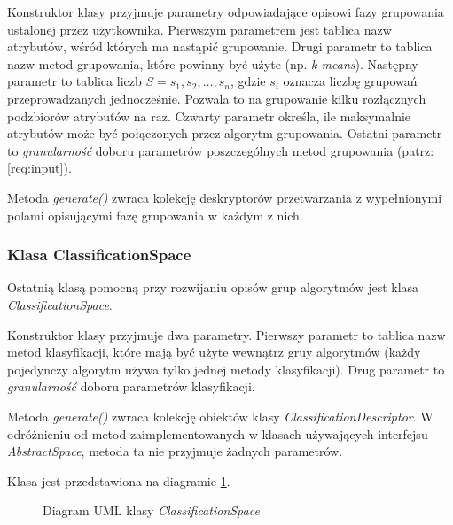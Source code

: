 \documentclass[../thesis.tex]{subfiles}
\begin{document}
Konstruktor klasy przyjmuje parametry odpowiadające opisowi fazy grupowania ustalonej przez użytkownika. Pierwszym parametrem jest tablica nazw atrybutów, wśród których ma nastąpić grupowanie. Drugi parametr to tablica nazw metod grupowania, które powinny być użyte (np. \emph{k-means}). Następny parametr to tablica liczb $S = s_1, s_2, \ldots, s_n$, gdzie $s_i$ oznacza liczbę grupowań przeprowadzanych jednocześnie. Pozwala to na grupowanie kilku rozłącznych podzbiorów atrybutów na raz. Czwarty parametr określa, ile maksymalnie atrybutów może być połączonych przez algorytm grupowania. Ostatni parametr to \emph{granularność} doboru parametrów poszczególnych metod grupowania (patrz: \ref{req:input}).

Metoda \emph{generate()} zwraca kolekcję deskryptorów przetwarzania z wypełnionymi polami opisującymi fazę grupowania w każdym z nich.

\subsubsection{Klasa ClassificationSpace}

Ostatnią klasą pomocną przy rozwijaniu opisów grup algorytmów jest klasa \emph{ClassificationSpace}.

Konstruktor klasy przyjmuje dwa parametry. Pierwszy parametr to tablica nazw metod klasyfikacji, które mają być użyte wewnątrz gruy algorytmów (każdy pojedynczy algorytm używa tylko jednej metody klasyfikacji). Drug parametr to \emph{granularność} doboru parametrów klasyfikacji.

Metoda \emph{generate()} zwraca kolekcję obiektów klasy \emph{ClassificationDescriptor}. W odróżnieniu od metod zaimplementowanych w klasach używających interfejsu \emph{AbstractSpace}, metoda ta nie przyjmuje żadnych parametrów.

Klasa jest przedstawiona na diagramie \ref{proj:diagram_classification_space}.

\begin{figure}[h]
\centering
{}
\caption{Diagram UML klasy \emph{ClassificationSpace}}
\label{proj:diagram_classification_space}
\end{figure}
\end{document}
